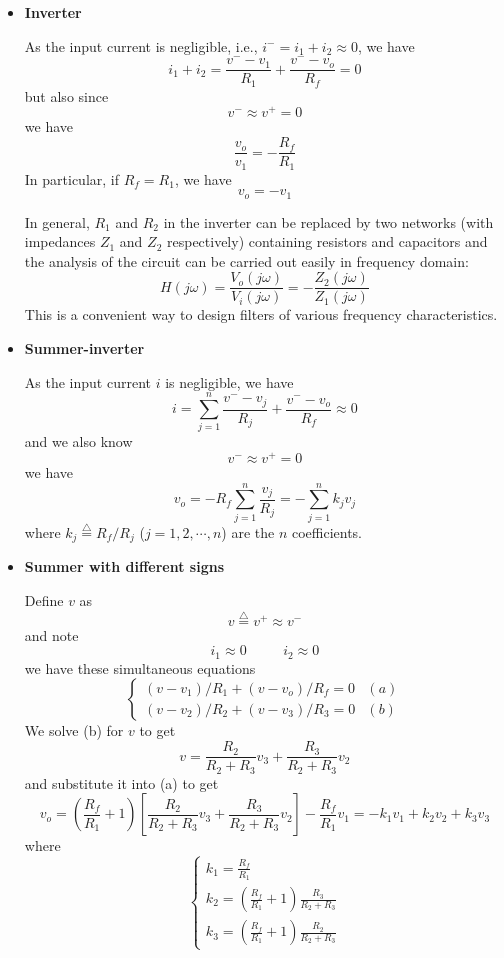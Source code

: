 \begin{itemize}
\item {\bf Inverter}


As the input current is negligible, i.e., $i^-=i_1+i_2 \approx 0$, we have
\[
	i_1+i_2= \frac{v^- -v_1}{R_1}+\frac{v^- -v_o}{R_f}=0
\]
but also since
\[	v^- \approx v^+ = 0	\]
we have
\[	\frac{v_o}{v_1}=-\frac{R_f}{R_1}	\]
In particular, if $R_f=R_1$, we have
\[	v_o=-v_1	\]

In general, $R_1$ and $R_2$ in the inverter can be replaced by two networks
(with impedances $Z_1$ and $Z_2$ respectively) containing resistors and capacitors 
and the analysis of the circuit can be carried out easily in frequency domain:
\[
H(j\omega)=\frac{V_o(j\omega)}{V_i(j\omega)}=-\frac{Z_2(j\omega)}{Z_1(j\omega)}	
\]
This is a convenient way to design filters of various frequency characteristics.


\item {\bf Summer-inverter}


As the input current $i$ is negligible, we have
\[ i=\sum_{j=1}^n \frac{v^--v_j}{R_j}+\frac{v^--v_o}{R_f} \approx 0	\]
and we also know
\[	v^- \approx v^+= 0 \]
we have
\[
	v_o=-R_f \sum_{j=1}^n \frac{v_j}{R_j} = - \sum_{j=1}^n k_j v_j \]
where $k_j \stackrel{\triangle}{=}R_f/R_j$ ($j=1,2,\cdots,n$) are the $n$ 
coefficients.

\item {\bf Summer with different signs}


Define $v$ as
\[	v\stackrel{\triangle}{=}v^+ \approx v^- \]
and note
\[	i_1 \approx 0 \;\;\;\;\mbox{   }\;\;\; i_2 \approx 0	\]
we have these simultaneous equations
\[
\left\{ \begin{array}{ll} 
	(v-v_1)/R_1+(v-v_o)/R_f=0 & (a) \\
	(v-v_2)/R_2+(v-v_3)/R_3=0 & (b) 
	\end{array} \right.
\]
We solve (b) for $v$ to get
\[	v=\frac{R_2}{R_2+R_3} v_3 + \frac{R_3}{R_2+R_3}v_2	\]
and substitute it into (a) to get
\[
v_o=(\frac{R_f}{R_1}+1)[\frac{R_2}{R_2+R_3} v_3+\frac{R_3}{R_2+R_3} v_2]-\frac{R_f}{R_1}v_1
=-k_1v_1+k_2v_2+k_3v_3	
\]
where
\[ \left\{ \begin{array}{l} k_1=\frac{R_f}{R_1}	\\ 
	k_2=(\frac{R_f}{R_1}+1)\frac{R_3}{R_2+R_3} \\
	k_3=(\frac{R_f}{R_1}+1)\frac{R_2}{R_2+R_3} \end{array} \right.
\]


\end{itemize}
